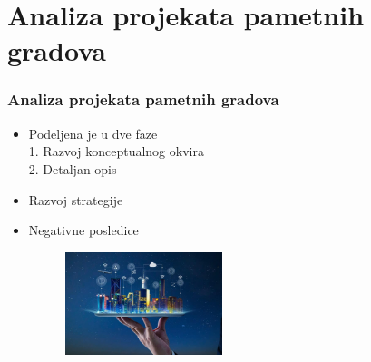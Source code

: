 \documentclass{beamer}
\begin{document}
\section{Analiza projekata pametnih gradova}
\begin{frame}[fragile]\frametitle{Analiza projekata pametnih gradova}

\begin{itemize}
    \item Podeljena je u dve faze\\
    1. Razvoj konceptualnog okvira\\
    2. Detaljan opis
    \item Razvoj strategije
    \item Negativne posledice
    \begin{figure}[h!]
        \centering
        \includegraphics[height=3cm]{pametni gradovi.jpg} 
\end{figure}
\end{itemize}

\end{frame}
\end{document}
